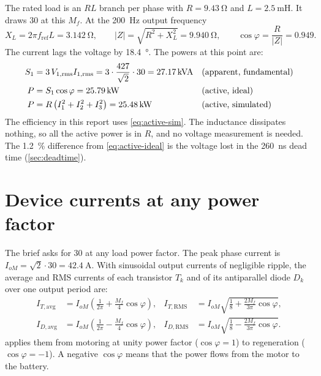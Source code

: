 The rated load is an $RL$ branch per phase with $R = \SI{9.43}{\ohm}$ and
$L = \SI{2.5}{\milli\henry}$. It draws \SI{30}{\Arms} at this $M_f$. At the
\SI{200}{\hertz} output frequency
%
\begin{equation}
  X_L = 2\pi f_\mathrm{ref} L = \SI{3.142}{\ohm},
  \qquad
  |Z| = \sqrt{R^2 + X_L^2} = \SI{9.940}{\ohm},
  \qquad
  \cos\varphi = \frac{R}{|Z|} = 0.949 .
  \label{eq:powerfactor}
\end{equation}
%
The current lags the voltage by \SI{18.4}{\degree}. The powers at this point
are:
%
\begin{align}
  S_1 &= 3\,V_{1,\mathrm{rms}} I_{1,\mathrm{rms}}
       = 3 \cdot \frac{427}{\sqrt{2}} \cdot 30
       = \SI{27.17}{\kilo\VA}
       &&\text{(apparent, fundamental)} \label{eq:apparent}\\
  P   &= S_1 \cos\varphi = \SI{25.79}{\kilo\watt}
       &&\text{(active, ideal)} \label{eq:active-ideal}\\
  P   &= R\left(I_1^2 + I_2^2 + I_3^2\right) = \SI{25.48}{\kilo\watt}
       &&\text{(active, simulated)} \label{eq:active-sim}
\end{align}
%
The efficiency in this report uses \cref{eq:active-sim}. The inductance
dissipates nothing, so all the active power is in $R$, and no voltage
measurement is needed. The \SI{1.2}{\percent} difference from
\cref{eq:active-ideal} is the voltage lost in the \SI{260}{\nano\second}
dead time (\cref{sec:deadtime}).

\section{Device currents at any power factor}
\label{sec:anypf}

The brief asks for \SI{30}{\Arms} at any load power factor. The peak phase
current is $I_{oM} = \sqrt{2}\cdot 30 = \SI{42.4}{\ampere}$. With sinusoidal
output currents of negligible ripple, the average and RMS currents of each
transistor $T_k$ and of its antiparallel diode $D_k$ over one output period
are:
%
\begin{align}
  I_{T,\mathrm{avg}} &= I_{oM}\left(\frac{1}{2\pi} + \frac{M_f}{4}\cos\varphi\right), &
  I_{T,\mathrm{RMS}} &= I_{oM}\sqrt{\frac{1}{8} + \frac{2M_f}{3\pi}\cos\varphi},
  \label{eq:it}\\
  I_{D,\mathrm{avg}} &= I_{oM}\left(\frac{1}{2\pi} - \frac{M_f}{4}\cos\varphi\right), &
  I_{D,\mathrm{RMS}} &= I_{oM}\sqrt{\frac{1}{8} - \frac{2M_f}{3\pi}\cos\varphi}.
  \label{eq:id}
\end{align}
%
 applies them from motoring at unity power factor
($\cos\varphi = 1$) to regeneration ($\cos\varphi = -1$). A negative
$\cos\varphi$ means that the power flows from the motor to the battery.

